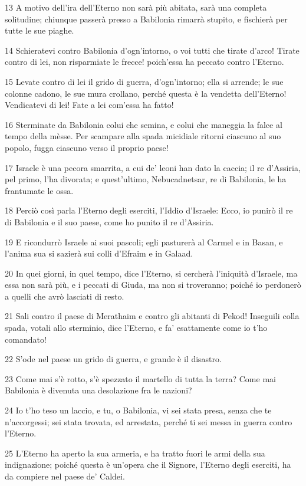 \par 13 A motivo dell'ira dell'Eterno non sarà più abitata, sarà una completa solitudine; chiunque passerà presso a Babilonia rimarrà stupito, e fischierà per tutte le sue piaghe.
\par 14 Schieratevi contro Babilonia d'ogn'intorno, o voi tutti che tirate d'arco! Tirate contro di lei, non risparmiate le frecce! poich'essa ha peccato contro l'Eterno.
\par 15 Levate contro di lei il grido di guerra, d'ogn'intorno; ella si arrende; le sue colonne cadono, le sue mura crollano, perché questa è la vendetta dell'Eterno! Vendicatevi di lei! Fate a lei com'essa ha fatto!
\par 16 Sterminate da Babilonia colui che semina, e colui che maneggia la falce al tempo della mèsse. Per scampare alla spada micidiale ritorni ciascuno al suo popolo, fugga ciascuno verso il proprio paese!
\par 17 Israele è una pecora smarrita, a cui de' leoni han dato la caccia; il re d'Assiria, pel primo, l'ha divorata; e quest'ultimo, Nebucadnetsar, re di Babilonia, le ha frantumate le ossa.
\par 18 Perciò così parla l'Eterno degli eserciti, l'Iddio d'Israele: Ecco, io punirò il re di Babilonia e il suo paese, come ho punito il re d'Assiria.
\par 19 E ricondurrò Israele ai suoi pascoli; egli pasturerà al Carmel e in Basan, e l'anima sua si sazierà sui colli d'Efraim e in Galaad.
\par 20 In quei giorni, in quel tempo, dice l'Eterno, si cercherà l'iniquità d'Israele, ma essa non sarà più, e i peccati di Giuda, ma non si troveranno; poiché io perdonerò a quelli che avrò lasciati di resto.
\par 21 Sali contro il paese di Merathaim e contro gli abitanti di Pekod! Inseguili colla spada, votali allo sterminio, dice l'Eterno, e fa' esattamente come io t'ho comandato!
\par 22 S'ode nel paese un grido di guerra, e grande è il disastro.
\par 23 Come mai s'è rotto, s'è spezzato il martello di tutta la terra? Come mai Babilonia è divenuta una desolazione fra le nazioni?
\par 24 Io t'ho teso un laccio, e tu, o Babilonia, vi sei stata presa, senza che te n'accorgessi; sei stata trovata, ed arrestata, perché ti sei messa in guerra contro l'Eterno.
\par 25 L'Eterno ha aperto la sua armeria, e ha tratto fuori le armi della sua indignazione; poiché questa è un'opera che il Signore, l'Eterno degli eserciti, ha da compiere nel paese de' Caldei.
